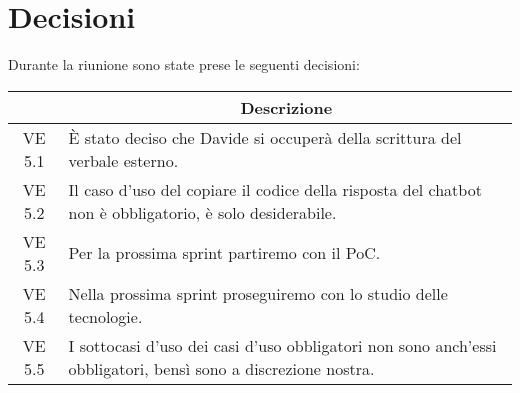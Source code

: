 

\section{Decisioni}

Durante la riunione sono state prese le seguenti decisioni:

\vspace{0.5cm}

\begin{table}[htbp]
    \centering
    \begin{tabular}{|c|p{}|}
        \hline
        \rowcolor[gray]{0.75}
        \multicolumn{1}{|c|}{\textbf{Codice}} & \multicolumn{1}{|c|}{\textbf{Descrizione}}\\
        \hline
        VE 5.1 & È stato deciso che Davide si occuperà della scrittura del verbale esterno. \\
        VE 5.2 & Il caso d'uso del copiare il codice della risposta del chatbot non è obbligatorio, è solo desiderabile. \\
        VE 5.3 & Per la prossima sprint partiremo con il PoC. \\
        VE 5.4 & Nella prossima sprint proseguiremo con lo studio delle tecnologie. \\
        VE 5.5 & I sottocasi d'uso dei casi d'uso obbligatori non sono anch'essi obbligatori, bensì sono a discrezione nostra. \\
        \hline
    \end{tabular}
\end{table}